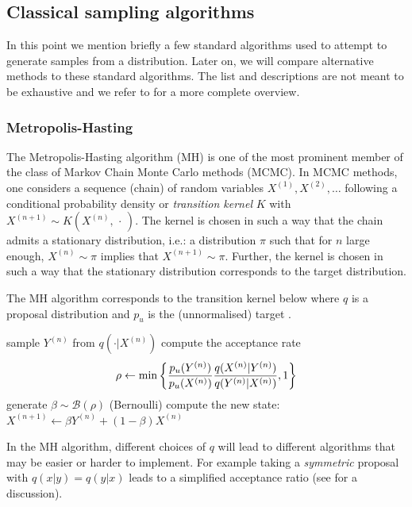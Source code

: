 \subsection{\label{point:classical-sampling}Classical sampling algorithms}

In this point we mention briefly a few standard algorithms used to attempt to generate samples from a distribution.
Later on, we will compare alternative methods to these standard algorithms.
The list and descriptions are not meant to be exhaustive and we refer to \citet{robert04, green15} for a more complete overview.

\subsubsection{Metropolis-Hasting}
The Metropolis-Hasting algorithm (MH) is one of the most prominent member of the class of Markov Chain Monte Carlo methods (MCMC). In MCMC methods, one considers a sequence (chain) of random variables $X^{(1)}, X^{(2)},\dots$ following a conditional probability density or \emph{transition kernel} $K$ with $X^{(n+1)} \sim K(X^{(n)}, \,\cdot\,)$. 
The kernel is chosen in such a way that the chain admits a stationary distribution, i.e.: a distribution $\pi$ such that for $n$ large enough, $X^{(n)}\sim \pi$ implies that $X^{(n+1)}\sim\pi$. Further, the kernel is chosen in such a way that the stationary distribution corresponds to the target distribution.

The MH algorithm corresponds to the transition kernel below where $q$ is a proposal distribution and $p_{u}$ is the (unnormalised) target \citep[chapter 6]{robert04}.

\begin{algorithm}[!h]\small
	\caption{\label{alg:mh-kernel}}
	\begin{algorithmic}[1]
		\State sample $Y^{(n)}$ from  $q(\cdot | X^{(n)})$
		\State compute the acceptance rate
			$$ \rho \leftarrow \min\left\{ {p_{u}(Y^{(n)})\over p_{u}(X^{(n)})}{q(X^{(n)}|Y^{(n)})\over q(Y^{(n)}|X^{(n)})}, 1\right\} $$
		\State generate $\beta\sim \mathcal B(\rho)$ (Bernoulli)
		\State compute the new state: $X^{(n+1)} \leftarrow \beta Y^{(n)} + (1-\beta)X^{(n)} $
	\end{algorithmic}
\end{algorithm}

In the MH algorithm, different choices of $q$ will lead to different algorithms that may be easier or harder to implement. For example taking a \emph{symmetric} proposal with $q(x|y)=q(y|x)$ leads to a simplified acceptance ratio (see \citet{green15} for a discussion).

